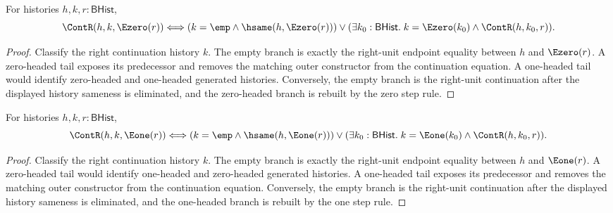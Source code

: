 \begin{theorem}
\label{thm:cont-result-e0-cases-iff}
For histories $h,k,r:\mathsf{BHist}$,
$$
\ContR(h,k,\Ezero(r))
\Longleftrightarrow
(k=\emp\land \hsame(h,\Ezero(r)))
\lor
(\exists k_0:\mathsf{BHist}.\; k=\Ezero(k_0)\land \ContR(h,k_0,r)).
$$
\end{theorem}
\begin{proof}
Classify the right continuation history $k$. The empty branch is exactly the
right-unit endpoint equality between $h$ and $\Ezero(r)$. A zero-headed tail
exposes its predecessor and removes the matching outer constructor from the
continuation equation. A one-headed tail would identify zero-headed and
one-headed generated histories. Conversely, the empty branch is the right-unit
continuation after the displayed history sameness is eliminated, and the
zero-headed branch is rebuilt by the zero step rule.
\end{proof}

\begin{theorem}
\label{thm:cont-result-e1-cases-iff}
For histories $h,k,r:\mathsf{BHist}$,
$$
\ContR(h,k,\Eone(r))
\Longleftrightarrow
(k=\emp\land \hsame(h,\Eone(r)))
\lor
(\exists k_0:\mathsf{BHist}.\; k=\Eone(k_0)\land \ContR(h,k_0,r)).
$$
\end{theorem}
\begin{proof}
Classify the right continuation history $k$. The empty branch is exactly the
right-unit endpoint equality between $h$ and $\Eone(r)$. A zero-headed tail
would identify one-headed and zero-headed generated histories. A one-headed tail
exposes its predecessor and removes the matching outer constructor from the
continuation equation. Conversely, the empty branch is the right-unit
continuation after the displayed history sameness is eliminated, and the
one-headed branch is rebuilt by the one step rule.
\end{proof}



